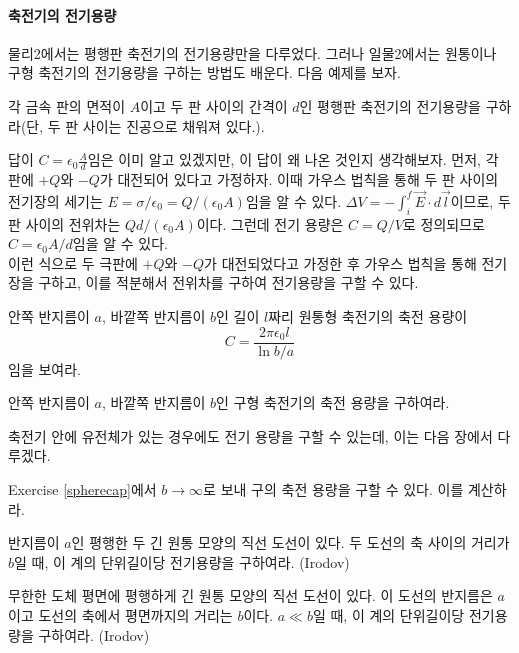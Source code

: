 \paragraph{축전기의 전기용량}
물리2에서는 평행판 축전기의 전기용량만을 다루었다. 그러나 일물2에서는 원통이나 구형 축전기의 전기용량을 구하는 방법도 배운다. 다음 예제를 보자.
\begin{example}
각 금속 판의 면적이 $A$이고 두 판 사이의 간격이 $d$인 평행판 축전기의 전기용량을 구하라(단, 두 판 사이는 진공으로 채워져 있다.). 
\end{example}
답이 $C=\epsilon_0\frac{A}{d}$임은 이미 알고 있겠지만, 이 답이 왜 나온 것인지 생각해보자. 먼저, 각 판에  $+Q$와 $-Q$가 대전되어 있다고 가정하자. 이때 가우스 법칙을 통해 두 판 사이의 전기장의 세기는 $E=\sigma/\epsilon_0=Q/(\epsilon_0A)$임을 알 수 있다. $\Delta V=-\int_i^f \vec{E}\cdot d\vec{l}$이므로, 두 판 사이의 전위차는 $Qd/(\epsilon_0 A)$이다. 그런데 전기 용량은 $C=Q/V$로 정의되므로  $C=\epsilon_0 A/d$임을 알 수 있다.\\
이런 식으로 두 극판에 $+Q$와 $-Q$가 대전되었다고 가정한 후 가우스 법칙을 통해 전기장을 구하고, 이를 적분해서 전위차를 구하여 전기용량을 구할 수 있다. 
\begin{exercise}
안쪽 반지름이 $a$, 바깥쪽 반지름이 $b$인 길이 $l$짜리 원통형 축전기의 축전 용량이 
\begin{equation}
C=\frac{2\pi\epsilon_0l}{\ln{b/a}}
\end{equation}
임을 보여라.
\end{exercise}

\begin{exercise}
안쪽 반지름이 $a$, 바깥쪽 반지름이 $b$인 구형 축전기의 축전 용량을 구하여라.\label{spherecap}
\end{exercise}
축전기 안에 유전체가 있는 경우에도 전기 용량을 구할 수 있는데, 이는 다음 장에서 다루겠다.\\

\begin{problem}
Exercise \ref{spherecap}에서 $b\to\infty$로 보내 구의 축전 용량을 구할 수 있다. 이를 계산하라.
\end{problem}

\begin{problem}
반지름이 $a$인 평행한 두 긴 원통 모양의 직선 도선이 있다. 두 도선의 축 사이의 거리가 $b$일 때, 이 계의 단위길이당 전기용량을 구하여라. (Irodov)
\end{problem}

\begin{problem}
무한한 도체 평면에 평행하게 긴 원통 모양의 직선 도선이 있다. 이 도선의 반지름은 $a$이고 도선의 축에서 평면까지의 거리는 $b$이다. $a\ll b$일 때, 이 계의 단위길이당 전기용량을 구하여라. (Irodov)
\end{problem}

